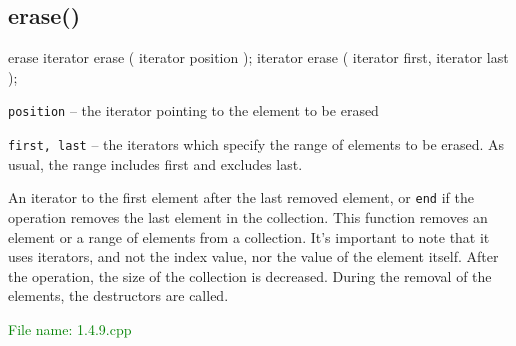 
\subsection{erase()} %
\begin{methodinfo}
  {erase}
  {iterator erase ( iterator position ); 
  iterator erase ( iterator first, iterator last );}
  {\texttt{position} – the iterator pointing to the element to be erased

  \texttt{first, last} – the iterators which specify the range of elements to be erased. 
  As usual, the range includes first and excludes last.}
  {An iterator to the first element after the last removed element, or \texttt{end} if the operation removes 
  the last element in the collection.}
  {This function removes an element or a range of elements from a collection. It’s important to note 
  that it uses iterators, and not the index value, nor the value of the element itself. After the 
  operation, the size of the collection is decreased. During the removal of the elements, 
  the destructors are called.}
\end{methodinfo}

\textcolor{green}{File name: 1.4.9.cpp}

